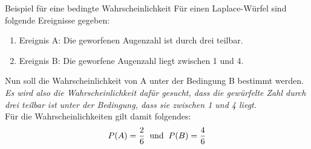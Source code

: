 \begin{bsp}{Beispiel für eine bedingte Wahrscheinlichkeit}{}
Für einen Laplace-Würfel sind folgende Ereignisse gegeben:\\
\begin{enumerate}
    \item Ereignis A: Die geworfenen Augenzahl ist durch drei teilbar.
    \item Ereignis B: Die geworfene Augenzahl liegt zwischen 1 und 4.
\end{enumerate}
Nun soll die Wahrscheinlichkeit von A unter der Bedingung B bestimmt werden.\\
\emph{Es wird also die Wahrscheinlichkeit dafür gesucht, dass die gewürfelte Zahl durch drei teilbar ist unter der Bedingung, dass sie zwischen 1 und 4 liegt.}\\[0.5cm]
Für die Wahrscheinlichkeiten gilt damit folgendes: $$P(A) = \dfrac{2}{6} \hspace{0.2cm} \text{und} \hspace{0.2cm} P(B) = \dfrac{4}{6} $$
\end{bsp}
